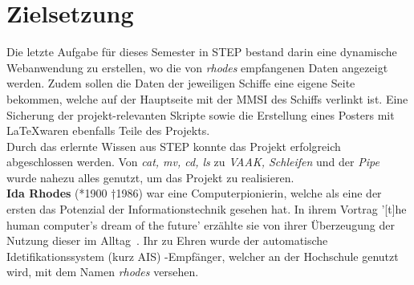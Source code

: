 \section*{Zielsetzung}
Die letzte Aufgabe für dieses Semester in STEP bestand darin eine dynamische Webanwendung zu erstellen, wo die von \textit{rhodes} empfangenen Daten angezeigt werden. Zudem sollen die Daten der jeweiligen Schiffe eine eigene Seite bekommen, welche auf der Hauptseite mit der MMSI des Schiffs verlinkt ist. Eine Sicherung der projekt-relevanten Skripte sowie die Erstellung eines Posters mit \LaTeX waren ebenfalls Teile des Projekts.
\\
Durch das erlernte Wissen aus STEP konnte das Projekt erfolgreich abgeschlossen werden. Von \textit{cat, mv, cd, ls} zu \textit{VAAK, Schleifen} und der \textit{Pipe} wurde nahezu alles genutzt, um das Projekt zu realisieren.
\\
\textbf{Ida Rhodes} (*1900 †1986) war eine Computerpionierin, welche als eine der ersten das Potenzial der Informationstechnik gesehen hat. In ihrem Vortrag '[t]he human computer's dream of the future' erzählte sie von ihrer Überzeugung der Nutzung dieser im Alltag~\autocite{Rhodes}. Ihr zu Ehren wurde der automatische Idetifikationssystem (kurz AIS) -Empfänger, welcher an der Hochschule genutzt wird, mit dem Namen \textit{rhodes} versehen.
